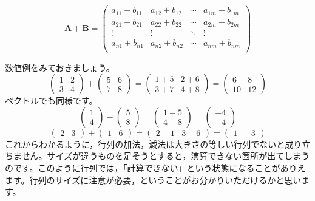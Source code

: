 \documentclass{ltjsbook}
\begin{document}
\begin{equation*}
	\bm{A}+\bm{B} =
	\begin{pmatrix}
		a_{11}+b_{11} & a_{12}+b_{12} & \cdots & a_{1m}+b_{1m} \\
		a_{21}+b_{21} & a_{22}+b_{22} & \cdots & a_{2m}+b_{2m} \\
		\vdots        & \vdots        & \ddots & \vdots        \\
		a_{n1}+b_{n1} & a_{n2}+b_{n2} & \cdots & a_{nm}+b_{nm} \\
	\end{pmatrix}
\end{equation*}

数値例をみておきましょう。
\begin{equation*}
	\begin{pmatrix}
		1 & 2 \\
		3 & 4
	\end{pmatrix}
	+
	\begin{pmatrix}
		5 & 6 \\
		7 & 8
	\end{pmatrix}
	=
	\begin{pmatrix}
		1+5 & 2+6 \\
		3+7 & 4+8
	\end{pmatrix}
	=
	\begin{pmatrix}
		6  & 8  \\
		10 & 12
	\end{pmatrix}
\end{equation*}
ベクトルでも同様です。
\begin{equation*}
	\begin{pmatrix}
		1 \\
		4
	\end{pmatrix}
	-
	\begin{pmatrix}
		5 \\
		8
	\end{pmatrix}
	=
	\begin{pmatrix}
		1-5 \\
		4-8
	\end{pmatrix}
	=
	\begin{pmatrix}
		-4 \\
		-4
	\end{pmatrix}
\end{equation*}
\begin{equation*}
	\begin{pmatrix}
		2 &
		3
	\end{pmatrix}
	+
	\begin{pmatrix}
		1 & 6
	\end{pmatrix}
	=
	\begin{pmatrix}
		2-1 & 3-6
	\end{pmatrix}
	=
	\begin{pmatrix}
		1 & -3
	\end{pmatrix}
\end{equation*}
これからわかるように，行列の加法，減法は大きさの等しい行列でないと成り立ちません。サイズが違うものを足そうとすると，演算できない箇所が出てしまうのです。このように行列では，\underline{「計算できない」という状態になること}がありえます。行列のサイズに注意が必要，ということがお分かりいただけるかと思います。
\end{document}
